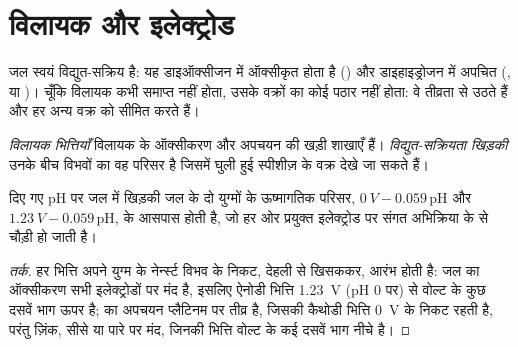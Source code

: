 \section{विलायक और इलेक्ट्रोड}

जल स्वयं विद्युत-सक्रिय है: यह डाइऑक्सीजन में ऑक्सीकृत होता है
() और डाइहाइड्रोजन में अपचित (, या
)। चूँकि विलायक कभी समाप्त नहीं होता, उसके वक्रों का
कोई पठार नहीं होता: वे तीव्रता से उठते हैं और हर अन्य वक्र को सीमित करते हैं।

\begin{definition}[विद्युत-सक्रियता खिड़की]\label{def:b2:current-potential-curves:window}
\emph{विलायक भित्तियाँ} विलायक के ऑक्सीकरण और अपचयन
की खड़ी शाखाएँ हैं। \emph{विद्युत-सक्रियता
खिड़की} उनके बीच विभवों का वह परिसर है
जिसमें घुली हुई स्पीशीज़ के वक्र देखे जा सकते हैं।
\end{definition}

\begin{proposition}[जल की खिड़की]\label{prop:b2:current-potential-curves:window}
दिए गए pH पर जल में खिड़की जल के दो युग्मों के ऊष्मागतिक परिसर,
$\qty{0}{V} - 0.059\,\mathrm{pH}$ और $\qty{1.23}{V} -
0.059\,\mathrm{pH}$, के आसपास होती है, जो हर ओर प्रयुक्त इलेक्ट्रोड पर संगत
अभिक्रिया के  से चौड़ी हो जाती है।
\end{proposition}

\begin{proof}[तर्क]
हर भित्ति अपने युग्म के नेर्न्स्ट विभव के निकट, देहली  से खिसककर,
आरंभ होती है: जल का ऑक्सीकरण सभी इलेक्ट्रोडों पर मंद है, इसलिए
ऐनोडी भित्ति \qty{1.23}{V} (pH 0 पर) से वोल्ट के कुछ दसवें भाग ऊपर है;
 का अपचयन प्लैटिनम पर तीव्र है, जिसकी कैथोडी भित्ति
\qty{0}{V} के निकट रहती है, परंतु ज़िंक, सीसे या पारे पर मंद, जिनकी भित्ति वोल्ट के
कई दसवें भाग नीचे है।
\end{proof}

